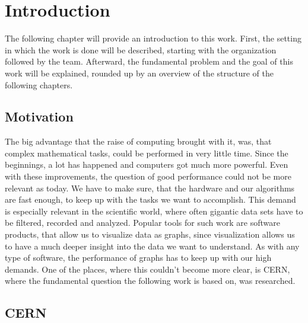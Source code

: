 
\chapter{Introduction}
\label{ch:Introduction}

The following chapter will provide an introduction to this work. First, the
setting in which the work is done will be described, starting with the
organization followed by the team. Afterward, the fundamental problem and the
goal of this work will be explained, rounded up by an overview of the structure
of the following chapters.





\section{Motivation}
\label{sec:Introduction:Motivation}

The big advantage that the raise of computing brought with it, was, that complex
mathematical tasks, could be performed in very little time. Since the
beginnings, a lot has happened and computers got much more powerful. Even with
these improvements, the question of good performance could not be more relevant
as today. We have to make sure, that the hardware and our algorithms are fast
enough, to keep up with the tasks we want to accomplish. This demand is
especially relevant in the scientific world, where often gigantic data sets have
to be filtered, recorded and analyzed. Popular tools for such work are software
products, that allow us to visualize data as graphs, since visualization allows
us to have a much deeper insight into the data we want to understand. As with
any type of software, the performance of graphs has to keep up with our high
demands. One of the places, where this couldn't become more clear, is CERN,
where the fundamental question the following work is based on, was researched.





\section{CERN}
\label{sec:Introduction:CERN}

